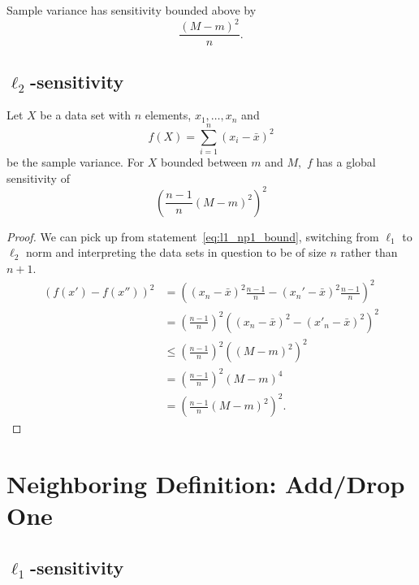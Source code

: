 \documentclass[11pt]{scrartcl} %
\begin{document}
\begin{corollary}
Sample variance has sensitivity bounded above by
$$ \frac{(M-m)^2 }{n}. $$
\end{corollary}

\subsection{$\ell_2$-sensitivity}
\begin{theorem}
	Let $X$ be a data set with $n$ elements, $x_1, \hdots, x_n$ and
	\[ f(X) = \sum_{i=1}^n (x_i - \bar{x})^2 \]
	be the sample variance.
	For $X$ bounded between $m$ and $M,$ $f$ has a global sensitivity of
	\[ \left( \frac{n-1}{n} (M-m)^2 \right)^2 \]
\end{theorem}

\begin{proof}
	We can pick up from statement~\ref{eq:l1_np1_bound}, switching from $\ell_1$ to $\ell_2$ norm and interpreting
	the data sets in question to be of size $n$ rather than $n+1$.
	\begin{align*}
		(f(x') - f(x''))^2
			&= \left( (x_{n}-\bar{x})^2 \frac{n-1}{n} - (x_{n}'-\bar{x})^2 \frac{n-1}{n} \right)^2 \\
			&= \left( \frac{n-1}{n} \right)^2 \left( (x_n - \bar{x})^2 - (x'_n - \bar{x})^2 \right)^2 \\
			&\leq \left( \frac{n-1}{n} \right)^2 \left( (M-m)^2 \right)^2 \\
			&= \left( \frac{n-1}{n} \right)^2 (M - m)^4 \\
			&= \left( \frac{n-1}{n} (M - m)^2 \right)^2.
	\end{align*}
\end{proof}

\section{Neighboring Definition: Add/Drop One}
\subsection{$\ell_1$-sensitivity}
\end{document}
